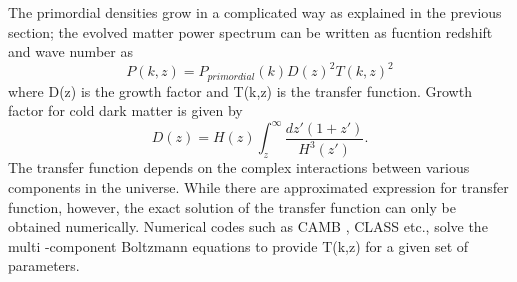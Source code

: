 The primordial densities grow in a complicated way as explained in the previous section; the evolved matter power spectrum can be written as fucntion redshift and wave number as
\begin{equation}
P(k,z) = P_{primordial} (k) D(z)^{2} T(k,z)^{2}
\end{equation}
where D(z) is the growth factor and T(k,z) is the transfer function. 
Growth factor for cold dark matter is given by
\begin{equation}
D(z) = H(z) \int^{\infty}_{z} \frac{dz'(1+z')}{H^{3}(z')}.
\end{equation}
The transfer function depends on the complex interactions between various components in the universe. 
While there are approximated expression for transfer function, however, the exact solution of the transfer function can only be obtained numerically. 
Numerical codes such as CAMB \citep{lewis00}, CLASS \citep{seljak96} etc., solve the multi -component Boltzmann equations to provide T(k,z) for a given set of parameters. 


